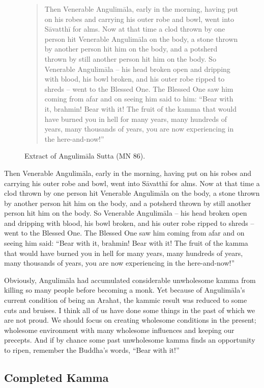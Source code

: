 \begin{figure}[H]
\begin{quotation}
Then Venerable Angulimāla, early in the morning, having put on his robes and carrying his outer robe and bowl, went into Sāvatthī for alms. Now at that time a clod thrown by one person hit Venerable Angulimāla on the body, a stone thrown by another person hit him on the body, and a potsherd thrown by still another person hit him on the body. So Venerable Angulimāla – his head broken open and dripping with blood, his bowl broken, and his outer robe ripped to shreds – went to the Blessed One. The Blessed One saw him coming from afar and on seeing him said to him: “Bear with it, brahmin! Bear with it! The fruit of the kamma that would have burned you in hell for many years, many hundreds of years, many thousands of years, you are now experiencing in the here-and-now!”
\end{quotation}
\caption{Extract of Angulimāla Sutta (MN 86).}
\label{fig:MN86}
\end{figure}

Then Venerable Angulimāla, early in the morning, having put on his robes and carrying his outer robe and bowl, went into Sāvatthī for alms. Now at that time a clod thrown by one person hit Venerable Angulimāla on the body, a stone thrown by another person hit him on the body, and a potsherd thrown by still another person hit him on the body. So Venerable Angulimāla – his head broken open and dripping with blood, his bowl broken, and his outer robe ripped to shreds – went to the Blessed One. The Blessed One saw him coming from afar and on seeing him said: “Bear with it, brahmin! Bear with it! The fruit of the kamma that would have burned you in hell for many years, many hundreds of years, many thousands of years, you are now experiencing in the here-and-now!”

Obviously, Angulimāla had accumulated considerable unwholesome kamma from killing so many people before becoming a monk. Yet because of Angulimāla’s current condition of being an Arahat, the kammic result was reduced to some cuts and bruises. I think all of us have done some things in the past of which we are not proud. We should focus on creating wholesome conditions in the present; wholesome environment with many wholesome influences and keeping our precepts. And if by chance some past unwholesome kamma finds an opportunity to ripen, remember the Buddha’s words, “Bear with it!”

\subsection*{Completed Kamma}

